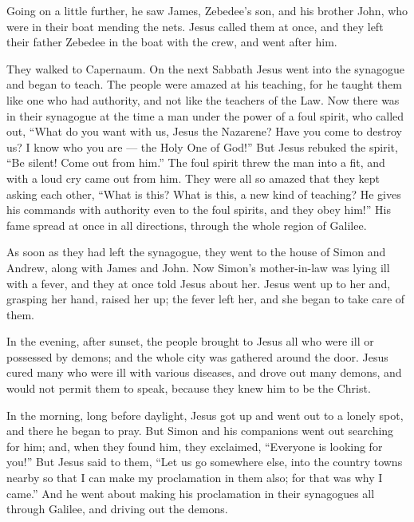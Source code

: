  Going on a little further, he saw James, Zebedee's son,
and his brother John, who were in their boat mending the nets.
 Jesus called them at once, and they left their father
Zebedee in the boat with the crew, and went after him.

 They walked to Capernaum. On the next Sabbath Jesus went
into the synagogue and began to teach.  The people were
amazed at his teaching, for he taught them like one who had authority,
and not like the teachers of the Law.  Now there was in
their synagogue at the time a man under the power of a foul spirit, who
called out,  ``What do you want with us, Jesus the
Nazarene? Have you come to destroy us? I know who you are --- the Holy
One of God!''  But Jesus rebuked the spirit, ``Be silent!
Come out from him.''  The foul spirit threw the man into a
fit, and with a loud cry came out from him.  They were all
so amazed that they kept asking each other, ``What is this? What is
this, a new kind of teaching? He gives his commands with authority even
to the foul spirits, and they obey him!''  His fame spread
at once in all directions, through the whole region of Galilee.

 As soon as they had left the synagogue, they went to the
house of Simon and Andrew, along with James and John.  Now
Simon's mother-in-law was lying ill with a fever, and they at once told
Jesus about her.  Jesus went up to her and, grasping her
hand, raised her up; the fever left her, and she began to take care of
them.

 In the evening, after sunset, the people brought to Jesus
all who were ill or possessed by demons;  and the whole
city was gathered around the door.  Jesus cured many who
were ill with various diseases, and drove out many demons, and would not
permit them to speak, because they knew him to be the Christ.

 In the morning, long before daylight, Jesus got up and
went out to a lonely spot, and there he began to pray.  But
Simon and his companions went out searching for him;  and,
when they found him, they exclaimed, ``Everyone is looking for you!''
 But Jesus said to them, ``Let us go somewhere else, into
the country towns nearby so that I can make my proclamation in them
also; for that was why I came.''  And he went about making
his proclamation in their synagogues all through Galilee, and driving
out the demons.

